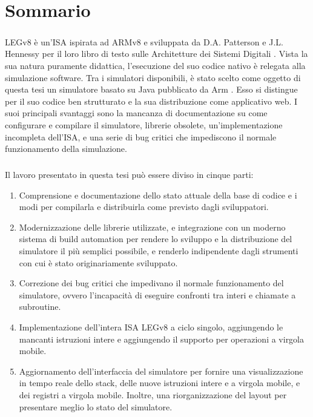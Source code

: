 \chapter{Sommario}\label{chap:somm}
\paragraph{}
LEGv8 è un'ISA ispirata ad ARMv8 e sviluppata da D.A. Patterson e J.L. Hennessy per il loro libro di testo sulle Architetture dei Sistemi Digitali \cite{patterson2016computer}. Vista la sua natura puramente didattica, l'esecuzione del suo codice nativo è relegata alla simulazione software.
Tra i simulatori disponibili, è stato scelto come oggetto di questa tesi un simulatore basato su Java \cite{legv8simARMrepo} pubblicato da Arm \cite{armweb}. Esso si distingue per il suo codice ben strutturato e la sua distribuzione come applicativo web. I suoi principali svantaggi sono la mancanza di documentazione su come configurare e compilare il simulatore, librerie obsolete, un'implementazione incompleta dell'ISA, e una serie di bug critici che impediscono il normale funzionamento della simulazione.
\paragraph{}
Il lavoro presentato in questa tesi può essere diviso in cinque parti:
\begin{enumerate}
    \item Comprensione e documentazione dello stato attuale della base di codice e i modi per compilarla e distribuirla come previsto dagli sviluppatori.
    \item Modernizzazione delle librerie utilizzate, e integrazione con un moderno sistema di build automation \cite{mavenweb} per rendere lo sviluppo e la distribuzione del simulatore il più semplici possibile, e renderlo indipendente dagli strumenti con cui è stato originariamente sviluppato.
    \item Correzione dei bug critici che impedivano il normale funzionamento del simulatore, ovvero l'incapacità di eseguire confronti tra interi e chiamate a subroutine.
    \item Implementazione dell'intera ISA LEGv8 a ciclo singolo, aggiungendo le mancanti istruzioni intere e aggiungendo il supporto per operazioni a virgola mobile.
    \item Aggiornamento  dell'interfaccia del simulatore per fornire una visualizzazione in tempo reale dello stack, delle nuove istruzioni intere e a virgola mobile, e dei registri a virgola mobile. Inoltre, una riorganizzazione del layout per presentare meglio lo stato del simulatore.
\end{enumerate}


